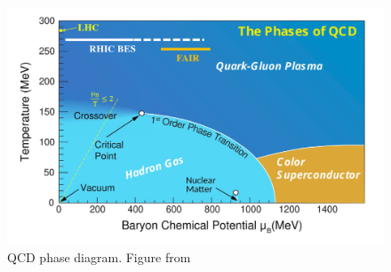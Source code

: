 \begin{figure}[ht]
  \centering
  \includegraphics[width=.75\textwidth]{figures/qcd-phase-diagram.png}
  \caption{QCD phase diagram.  Figure from \protect\cite{Arslandok:2023utm}}
  \label{fig:qcd-phase-diagram}
\end{figure}
